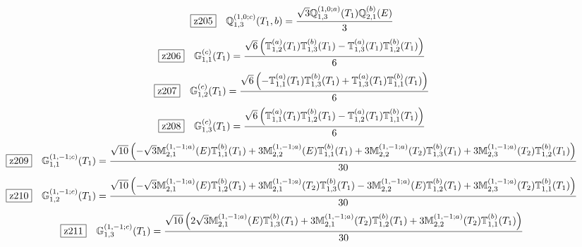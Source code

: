 \documentclass[fleqn,10pt,landscape]{jsarticle}
\begin{document}
\begin{dmath*}
\hspace*{3mm}\fbox{z205}\quad \mathbb{Q}_{1,3}^{(1,0;c)}(T_{1},b)=\frac{\sqrt{3} \mathbb{Q}_{1,3}^{(1,0;a)}(T_{1}) \mathbb{Q}_{2,1}^{(b)}(E)}{3}
\end{dmath*}
\begin{dmath*}
\hspace*{3mm}\fbox{z206}\quad \mathbb{G}_{1,1}^{(c)}(T_{1})=\frac{\sqrt{6} \left(\mathbb{T}_{1,2}^{(a)}(T_{1}) \mathbb{T}_{1,3}^{(b)}(T_{1}) - \mathbb{T}_{1,3}^{(a)}(T_{1}) \mathbb{T}_{1,2}^{(b)}(T_{1})\right)}{6}
\end{dmath*}
\begin{dmath*}
\hspace*{3mm}\fbox{z207}\quad \mathbb{G}_{1,2}^{(c)}(T_{1})=\frac{\sqrt{6} \left(- \mathbb{T}_{1,1}^{(a)}(T_{1}) \mathbb{T}_{1,3}^{(b)}(T_{1}) + \mathbb{T}_{1,3}^{(a)}(T_{1}) \mathbb{T}_{1,1}^{(b)}(T_{1})\right)}{6}
\end{dmath*}
\begin{dmath*}
\hspace*{3mm}\fbox{z208}\quad \mathbb{G}_{1,3}^{(c)}(T_{1})=\frac{\sqrt{6} \left(\mathbb{T}_{1,1}^{(a)}(T_{1}) \mathbb{T}_{1,2}^{(b)}(T_{1}) - \mathbb{T}_{1,2}^{(a)}(T_{1}) \mathbb{T}_{1,1}^{(b)}(T_{1})\right)}{6}
\end{dmath*}
\begin{dmath*}
\hspace*{3mm}\fbox{z209}\quad \mathbb{G}_{1,1}^{(1,-1;c)}(T_{1})=\frac{\sqrt{10} \left(- \sqrt{3} \mathbb{M}_{2,1}^{(1,-1;a)}(E) \mathbb{T}_{1,1}^{(b)}(T_{1}) + 3 \mathbb{M}_{2,2}^{(1,-1;a)}(E) \mathbb{T}_{1,1}^{(b)}(T_{1}) + 3 \mathbb{M}_{2,2}^{(1,-1;a)}(T_{2}) \mathbb{T}_{1,3}^{(b)}(T_{1}) + 3 \mathbb{M}_{2,3}^{(1,-1;a)}(T_{2}) \mathbb{T}_{1,2}^{(b)}(T_{1})\right)}{30}
\end{dmath*}
\begin{dmath*}
\hspace*{3mm}\fbox{z210}\quad \mathbb{G}_{1,2}^{(1,-1;c)}(T_{1})=\frac{\sqrt{10} \left(- \sqrt{3} \mathbb{M}_{2,1}^{(1,-1;a)}(E) \mathbb{T}_{1,2}^{(b)}(T_{1}) + 3 \mathbb{M}_{2,1}^{(1,-1;a)}(T_{2}) \mathbb{T}_{1,3}^{(b)}(T_{1}) - 3 \mathbb{M}_{2,2}^{(1,-1;a)}(E) \mathbb{T}_{1,2}^{(b)}(T_{1}) + 3 \mathbb{M}_{2,3}^{(1,-1;a)}(T_{2}) \mathbb{T}_{1,1}^{(b)}(T_{1})\right)}{30}
\end{dmath*}
\begin{dmath*}
\hspace*{3mm}\fbox{z211}\quad \mathbb{G}_{1,3}^{(1,-1;c)}(T_{1})=\frac{\sqrt{10} \left(2 \sqrt{3} \mathbb{M}_{2,1}^{(1,-1;a)}(E) \mathbb{T}_{1,3}^{(b)}(T_{1}) + 3 \mathbb{M}_{2,1}^{(1,-1;a)}(T_{2}) \mathbb{T}_{1,2}^{(b)}(T_{1}) + 3 \mathbb{M}_{2,2}^{(1,-1;a)}(T_{2}) \mathbb{T}_{1,1}^{(b)}(T_{1})\right)}{30}
\end{dmath*}
\end{document}
